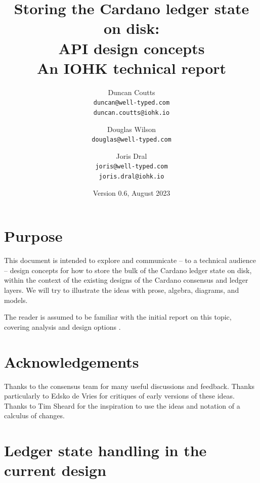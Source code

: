 \documentclass[11pt,a4paper]{article}
\begin{document}
\title{Storing the Cardano ledger state on disk: \\
       API design concepts \\
       {\large \sc An IOHK technical report}
  }
\date{Version 0.6, August 2023}
\author{Duncan Coutts      \\ {\small \texttt{duncan@well-typed.com}} \\
                              {\small \texttt{duncan.coutts@iohk.io}} \\
   \and Douglas Wilson     \\ {\small \texttt{douglas@well-typed.com}} \\
   \and Joris Dral         \\ {\small \texttt{joris@well-typed.com}} \\
                              {\small \texttt{joris.dral@iohk.io}} \\
   }

\maketitle

\section{Purpose}

This document is intended to explore and communicate -- to a technical audience
-- design concepts for how to store the bulk of the Cardano ledger state on
disk, within the context of the existing designs of the Cardano consensus and
ledger layers. We will try to illustrate the ideas with prose, algebra,
diagrams, and models.

The reader is assumed to be familiar with the initial report on this topic,
covering analysis and design options \citep{utxo-db}.

\section{Acknowledgements}

Thanks to the consensus team for many useful discussions and feedback. Thanks
particularly to Edsko de Vries for critiques of early versions of these ideas.
Thanks to Tim Sheard for the inspiration to use the ideas and notation of a
calculus of changes.

\tableofcontents

\section{Ledger state handling in the current design}
\label{ledger-state-handling-in-the-current-design}
\end{document}
